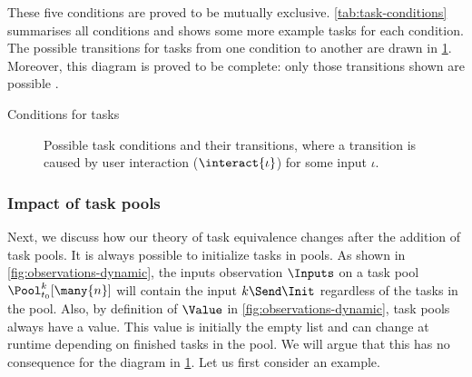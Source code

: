 These five conditions are proved to be mutually exclusive.
\cref{tab:task-conditions} summarises all conditions
and shows some more example tasks for each condition.
The possible transitions for tasks from one condition to another are drawn in \cref{fig:task-conditions}.
Moreover, this diagram is proved to be complete:
only those transitions shown are possible \cite{conf/sfp/KlijnsmaS22}.

\begin{table}
  
  \caption{Conditions for tasks}
  \label{tab:task-conditions}
\end{table}

\begin{figure}
  
  \caption{Possible task conditions and their transitions, where a transition is caused by user interaction ($\interact{\iota}$) for some input $\iota$.}
  \label{fig:task-conditions}
\end{figure}


\subsubsection{Impact of task pools}

Next, we discuss how our theory of task equivalence changes after the addition of task pools.
It is always possible to initialize tasks in pools.
As shown in \cref{fig:observations-dynamic},
the inputs observation $\Inputs$ on a task pool $\Pool_{t_0}^k [\many{n}]$ will contain the input $k\Send\Init$
regardless of the tasks in the pool.
Also, by definition of $\Value$ in \cref{fig:observations-dynamic},
task pools always have a value.
This value is initially the empty list
and can change at runtime depending on finished tasks in the pool.
We will argue that this has no consequence for the diagram in \cref{fig:task-conditions}.
Let us first consider an example.

